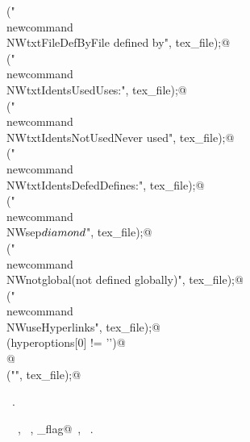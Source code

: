 \documentclass[a4paper]{report}
\begin{document}
\begin{flushleft}
\begin{minipage}{\linewidth}
\begin{list}{}{}
\mbox{}\verb@fputs("\\newcommand{\\NWtxtFileDefBy}{File defined by}\n", tex_file);@\\
\mbox{}\verb@fputs("\\newcommand{\\NWtxtIdentsUsed}{Uses:}\n", tex_file);@\\
\mbox{}\verb@fputs("\\newcommand{\\NWtxtIdentsNotUsed}{Never used}\n", tex_file);@\\
\mbox{}\verb@fputs("\\newcommand{\\NWtxtIdentsDefed}{Defines:}\n", tex_file);@\\
\mbox{}\verb@fputs("\\newcommand{\\NWsep}{${\\diamond}$}\n", tex_file);@\\
\mbox{}\verb@fputs("\\newcommand{\\NWnotglobal}{(not defined globally)}\n", tex_file);@\\
\mbox{}\verb@fputs("\\newcommand{\\NWuseHyperlinks}{", tex_file);@\\
\mbox{}\verb@if (hyperoptions[0] != '\0')@\\
\mbox{}@\\
\mbox{}\verb@fputs("}\n", tex_file);@\\
\mbox{}\verb@@{\NWsep}
\end{list}
\vspace{-1.5ex}
\footnotesize
\begin{list}{}{\setlength{\itemsep}{-\parsep}\setlength{\itemindent}{-\leftmargin}}
\item \NWtxtMacroRefIn\ .
\item \NWtxtIdentsUsed\nobreak\  \verb@fputs@\nobreak\ , \verb@hyperoptions@\nobreak\ , \verb@hyperref_flag@\nobreak\ , \verb@Uses@\nobreak\ .
\item{}
\end{list}
\end{minipage}\vspace{4ex}
\end{flushleft}
\end{document}
